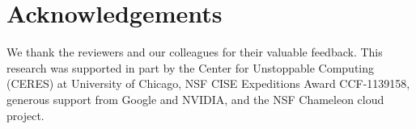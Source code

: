 \section*{Acknowledgements}
We thank the reviewers and our colleagues for their valuable feedback. This research was supported in part by the Center for Unstoppable Computing (CERES) at University of Chicago, NSF CISE Expeditions Award CCF-1139158, generous support from Google and NVIDIA, and the NSF Chameleon cloud project.